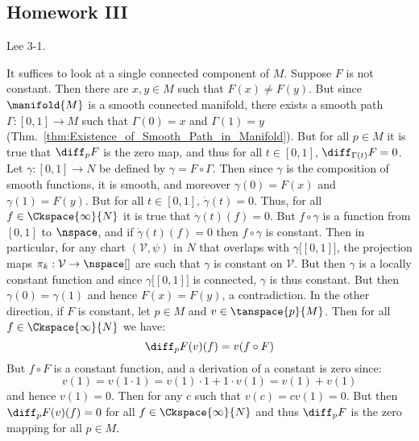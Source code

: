     \subsection{Homework III}
        \begin{problem}
            Lee 3-1.
        \end{problem}
        \begin{solution}
            It suffices to look at a single connected component of $M$.
            Suppose $F$ is not constant. Then there are $x,y\in{M}$ such
            that $F(x)\ne{F}(y)$. But since $\manifold{M}$ is a smooth
            connected manifold, there exists a smooth path
            $\Gamma:[0,1]\rightarrow{M}$ such that $\Gamma(0)=x$ and
            $\Gamma(1)=y$
            (Thm.~\ref{thm:Existence_of_Smooth_Path_in_Manifold}). But for
            all $p\in{M}$ it is true that $\diff_{p}F$ is the zero map, and
            thus for all $t\in[0,1]$, $\diff_{\Gamma(t)}F=0$. Let
            $\gamma:[0,1]\rightarrow{N}$ be defined by
            $\gamma=F\circ\Gamma$. Then since $\gamma$ is the composition of
            smooth functions, it is smooth, and moreover $\gamma(0)=F(x)$
            and $\gamma(1)=F(y)$. But for all $t\in[0,1]$,
            $\dot{\gamma}(t)=0$. Thus, for all $f\in\Ckspace{\infty}{N}$ it
            is true that $\dot{\gamma}(t)(f)=0$. But $f\circ\gamma$ is a
            function from $[0,1]$ to $\nspace$, and if
            $\dot{\gamma}(t)(f)=0$ then $f\circ\gamma$ is constant. Then in
            particular, for any chart $(\mathcal{V},\psi)$ in $N$ that
            overlaps with $\gamma\big[[0,1]\big]$, the projection maps
            $\pi_{k}:\mathcal{V}\rightarrow\nspace[]$ are such that $\gamma$
            is constant on $\mathcal{V}$. But then $\gamma$ is a locally
            constant function and since $\gamma\big[[0,1]\big]$ is
            connected, $\gamma$ is thus constant. But then
            $\gamma(0)=\gamma(1)$ and hence $F(x)=F(y)$, a contradiction. In
            the other direction, if $F$ is constant, let $p\in{M}$ and
            $v\in\tanspace{p}{M}$. Then for all
            $f\in\Ckspace{\infty}{N}$ we have:
            \begin{equation}
                \diff_{p}F(v)(f)=v(f\circ{F})
            \end{equation}
            But $f\circ{F}$ is a constant function, and a derivation of a
            constant is zero since:
            \begin{equation}
                v(1)=v(1\cdot{1})=v(1)\cdot{1}+1\cdot{v}(1)=v(1)+v(1)
            \end{equation}
            and hence $v(1)=0$. Then for any $c$ such that $v(c)=cv(1)=0$.
            But then $\diff_{p}F(v)(f)=0$ for all $f\in\Ckspace{\infty}{N}$
            and thus $\diff_{p}F$ is the zero mapping for all $p\in{M}$.
        \end{solution}
